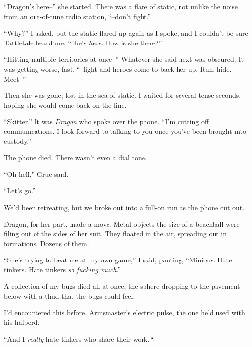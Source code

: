 ``Dragon's here--'' she started.  There was a flare of static, not unlike the noise from an out-of-tune radio station, ``--don't fight.''



``Why?'' I asked, but the static flared up again as I spoke, and I couldn't be sure Tattletale heard me.  ``She's \emph{here}.  How is she there?''



``Hitting multiple territories at once--'' Whatever she said next was obscured.  It was getting worse, fast.  ``--fight and heroes come to back her up.  Run, hide.  Meet--''



Then she was gone, lost in the sea of static.  I waited for several tense seconds, hoping she would come back on the line.



``Skitter.''  It was \emph{Dragon} who spoke over the phone.  ``I'm cutting off communications.  I look forward to talking to you once you've been brought into custody.''



The phone died.  There wasn't even a dial tone.



``Oh hell,'' Grue said.



``Let's go.''



We'd been retreating, but we broke out into a full-on run as the phone cut out.



Dragon, for her part, made a move.  Metal objects the size of a beachball were filing out of the sides of her suit.  They floated in the air, spreading out in formations.  Dozens of them.



``She's trying to beat me at my own game,'' I said, panting, ``Minions.  Hate tinkers.  Hate tinkers \emph{so fucking much}.''



A collection of my bugs died all at once, the sphere dropping to the pavement below with a thud that the bugs could feel.



I'd encountered this before.  Armsmaster's electric pulse, the one he'd used with his halberd.



``And I \emph{really} hate tinkers who share their work.\emph{``}



